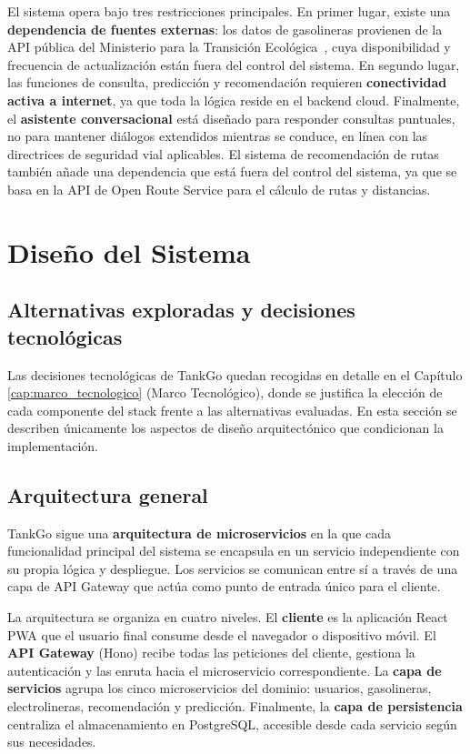 El sistema opera bajo tres restricciones principales. En primer lugar, existe una
\textbf{dependencia de fuentes externas}: los datos de gasolineras provienen de la API
pública del Ministerio para la Transición Ecológica~\cite{datosgob_carburantes}, cuya
disponibilidad y frecuencia de actualización están fuera del control del sistema. En segundo
lugar, las funciones de consulta, predicción y recomendación requieren \textbf{conectividad
  activa a internet}, ya que toda la lógica reside en el backend cloud. Finalmente, el
\textbf{asistente conversacional} está diseñado para responder consultas puntuales, no para
mantener diálogos extendidos mientras se conduce, en línea con las directrices de seguridad
vial aplicables. El sistema de recomendación de rutas también añade una dependencia que está fuera del control del sistema,
ya que se basa en la API de Open Route Service para el cálculo de rutas y distancias.

\section{Diseño del Sistema}
\label{sec:diseño_sistema}

\subsection{Alternativas exploradas y decisiones tecnológicas}
Las decisiones tecnológicas de TankGo quedan recogidas en detalle en el Capítulo \ref{cap:marco_tecnologico}
(Marco Tecnológico), donde se justifica la elección de cada
componente del stack frente a las alternativas evaluadas. En esta sección
se describen únicamente los aspectos de diseño arquitectónico que
condicionan la implementación.


\subsection{Arquitectura general}

TankGo sigue una \textbf{arquitectura de microservicios} en la que cada funcionalidad
principal del sistema se encapsula en un servicio independiente con su propia lógica y
despliegue. Los servicios se comunican entre sí a través de una capa de API Gateway que
actúa como punto de entrada único para el cliente.

La arquitectura se organiza en cuatro niveles. El \textbf{cliente} es la aplicación React
PWA que el usuario final consume desde el navegador o dispositivo móvil. El
\textbf{API Gateway} (Hono) recibe todas las peticiones del cliente, gestiona la
autenticación y las enruta hacia el microservicio correspondiente. La \textbf{capa de
  servicios} agrupa los cinco microservicios del dominio: usuarios, gasolineras,
electrolineras, recomendación y predicción. Finalmente, la \textbf{capa de persistencia}
centraliza el almacenamiento en PostgreSQL, accesible desde cada servicio según sus
necesidades.

